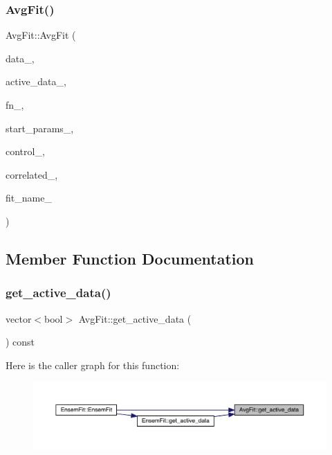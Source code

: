 \subsubsection{\texorpdfstring{AvgFit()}{AvgFit()}\hspace{0.1cm}{\footnotesize\ttfamily [2/2]}}
{\footnotesize\ttfamily Avg\+Fit\+::\+Avg\+Fit (\begin{DoxyParamCaption}\item[{const \mbox{\hyperlink{classData}{Data}} \&}]{data\+\_\+,  }\item[{const vector$<$ bool $>$ \&}]{active\+\_\+data\+\_\+,  }\item[{\mbox{\hyperlink{classFunction}{Function}} $\ast$}]{fn\+\_\+,  }\item[{const map$<$ string, \mbox{\hyperlink{structparam__value}{param\+\_\+value}} $>$ \&}]{start\+\_\+params\+\_\+,  }\item[{const \mbox{\hyperlink{structMinuitControl}{Minuit\+Control}} \&}]{control\+\_\+,  }\item[{bool}]{correlated\+\_\+,  }\item[{string}]{fit\+\_\+name\+\_\+ }\end{DoxyParamCaption})}



\subsection{Member Function Documentation}
\mbox{\label{classAvgFit_aafbaf377162566bd059950a6a4e454e9}} 
\subsubsection{\texorpdfstring{get\_active\_data()}{get\_active\_data()}\hspace{0.1cm}{\footnotesize\ttfamily [1/2]}}
{\footnotesize\ttfamily vector$<$bool$>$ Avg\+Fit\+::get\+\_\+active\+\_\+data (\begin{DoxyParamCaption}{ }\end{DoxyParamCaption}) const\hspace{0.3cm}{\ttfamily [inline]}}

Here is the caller graph for this function\+:
\nopagebreak
\begin{figure}[H]
\begin{center}
\leavevmode
\includegraphics[width=350pt]{d4/dfd/classAvgFit_aafbaf377162566bd059950a6a4e454e9_icgraph}
\end{center}
\end{figure}
\mbox{\label{classAvgFit_aafbaf377162566bd059950a6a4e454e9}} 
